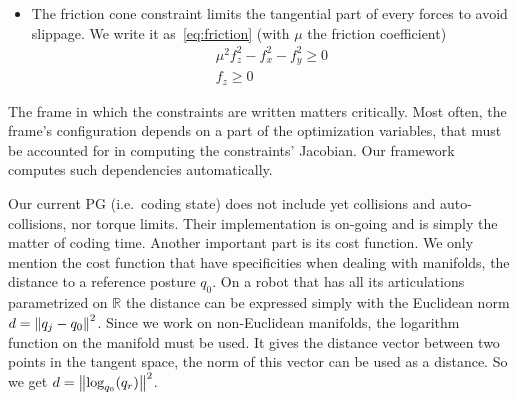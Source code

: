 \begin{itemize}
\item The friction cone constraint limits the tangential part of every forces to avoid slippage.
We write it as~\ref{eq:friction} (with $\mu$ the friction coefficient)
\begin{equation}
  \begin{split}
    \mu^2f_z^2-f_x^2-f_y^2 \geq 0 \\
    f_z \geq 0
  \end{split}
  \label{eq:friction}
\end{equation}
\end{itemize}

The frame in which the constraints are written matters critically.
Most often, the frame's configuration depends on a part of the optimization variables, that must be accounted for in computing the constraints' Jacobian.
Our framework computes such dependencies automatically.

Our current PG (i.e.\ coding state) does not include yet collisions and auto-collisions, nor torque limits.
Their implementation is on-going and is simply the matter of coding time.
Another important part is its cost function.
We only mention the cost function that have specificities when dealing with manifolds, the distance to a reference posture $q_0$.
On a robot that has all its articulations parametrized on $\mathbb{R}$ the distance can be expressed simply with the Euclidean norm $d = \left\| q_j-q_0 \right\|^2$.
Since we work on non-Euclidean manifolds, the logarithm function on the manifold must be used.
It gives the distance vector between two points in the tangent space, the norm of this vector can be used as a distance.
So we get $d = \left\| \text{log}_{q_0}(q_r) \right\|^2$.




